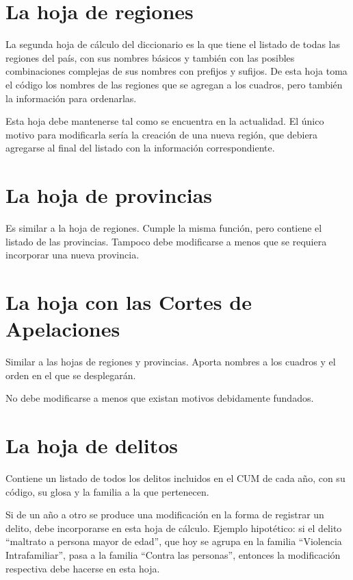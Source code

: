 \documentclass[
  spanish,
]{book}
\begin{document}
\hypertarget{la-hoja-de-regiones}{%
\section{La hoja de regiones}\label{la-hoja-de-regiones}}

La segunda hoja de cálculo del diccionario es la que tiene el listado de todas las regiones del país, con sus nombres básicos y también con las posibles combinaciones complejas de sus nombres con prefijos y sufijos. De esta hoja toma el código los nombres de las regiones que se agregan a los cuadros, pero también la información para ordenarlas.

Esta hoja debe mantenerse tal como se encuentra en la actualidad. El único motivo para modificarla sería la creación de una nueva región, que debiera agregarse al final del listado con la información correspondiente.

\hypertarget{la-hoja-de-provincias}{%
\section{La hoja de provincias}\label{la-hoja-de-provincias}}

Es similar a la hoja de regiones. Cumple la misma función, pero contiene el listado de las provincias. Tampoco debe modificarse a menos que se requiera incorporar una nueva provincia.

\hypertarget{la-hoja-con-las-cortes-de-apelaciones}{%
\section{La hoja con las Cortes de Apelaciones}\label{la-hoja-con-las-cortes-de-apelaciones}}

Similar a las hojas de regiones y provincias. Aporta nombres a los cuadros y el orden en el que se desplegarán.

No debe modificarse a menos que existan motivos debidamente fundados.

\hypertarget{la-hoja-de-delitos}{%
\section{La hoja de delitos}\label{la-hoja-de-delitos}}

Contiene un listado de todos los delitos incluidos en el CUM de cada año, con su código, su glosa y la familia a la que pertenecen.

Si de un año a otro se produce una modificación en la forma de registrar un delito, debe incorporarse en esta hoja de cálculo. Ejemplo hipotético: si el delito ``maltrato a persona mayor de edad'', que hoy se agrupa en la familia ``Violencia Intrafamiliar'', pasa a la familia ``Contra las personas'', entonces la modificación respectiva debe hacerse en esta hoja.
\end{document}
